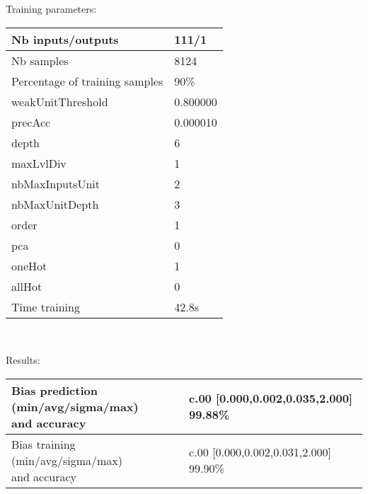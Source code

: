 Training parameters:\\
\begin{center}
\begin{tabular}{|l|l|}
\hline
Nb inputs/outputs&111/1\\
\hline
Nb samples&8124\\
\hline
Percentage of training samples&90\%\\
\hline
weakUnitThreshold&0.800000\\
\hline
precAcc&0.000010\\
\hline
depth&6\\
\hline
maxLvlDiv&1\\
\hline
nbMaxInputsUnit&2\\
\hline
nbMaxUnitDepth&3\\
\hline
order&1\\
\hline
pca&0\\
\hline
oneHot&1\\
\hline
allHot&0\\
\hline
Time training&42.8s\\
\hline
\end{tabular}\\
\end{center}\newline
Results:
\begin{center}
\begin{tabular}{|l|l|}
\hline
\makecell{Bias prediction (min/avg/sigma/max)\\and accuracy}&\makecell{c.00 [0.000,0.002,0.035,2.000] 99.88\%\\
}\\

\hline
\makecell{Bias training (min/avg/sigma/max)\\and accuracy}&\makecell{c.00 [0.000,0.002,0.031,2.000] 99.90\%\\
}\\
\hline
\end{tabular}\
\end{center}
